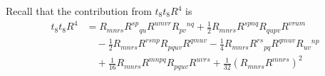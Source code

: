 Recall that the contribution from $t_8 t_8 R^4$ is
\begin{equation}
\begin{aligned}
t_8 t_8 R^4 
&= R_{mnrs} R^{sp}{}_{qu} R^{umvr} R_{pv}{}^{nq}
+ \frac{1}{2} R_{mnrs} R^{spnq} R_{qupv} R^{vrum} \\
&\quad - \frac{1}{2} R_{mnrs} R^{rsnp} R_{pquv} R^{qmuv}
- \frac{1}{4} R_{mnrs} R^{rs}{}_{pq} R^{qmuv} R_{uv}{}^{np}\\
&\quad + \frac{1}{16} R_{mnrs} R^{mnpq} R_{pquv} R^{uvrs}
+ \frac{1}{32} (R_{mnrs} R^{mnrs})^2
\end{aligned}
\end{equation}